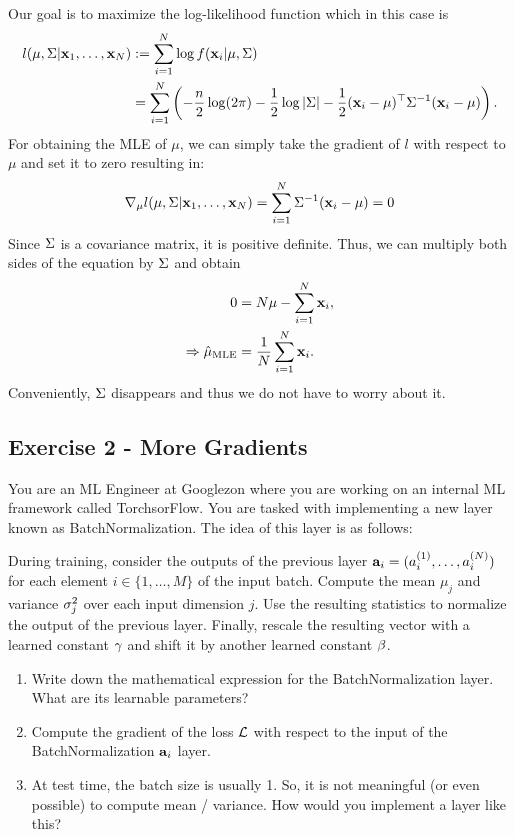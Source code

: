 \documentclass[
  letterpaper,
  DIV=11,
  numbers=noendperiod]{scrartcl}
\begin{document}
Our goal is to maximize the log-likelihood function which in this case
is \[\begin{aligned}
l(\mu, \Sigma| \mathbf{x}_1, \ldots, \mathbf{x}_N) 
  & := \sum_{i=1}^N \log f(\mathbf{x}_i | \mu, \Sigma) \\
  & = \sum_{i=1}^N \left( 
    - \frac{n}{2} \log (2 \pi) 
    - \frac{1}{2} \log |\Sigma|  
    - \frac{1}{2}  (\mathbf{x}_i - \mu)^\top \Sigma^{-1} (\mathbf{x}_i - \mu) 
  \right).
\end{aligned}\] For obtaining the MLE of \(\mu\), we can simply take the
gradient of \(l\) with respect to \(\mu\) and set it to zero resulting
in: \[
\nabla_\mu l(\mu, \Sigma| \mathbf{x}_1, \ldots, \mathbf{x}_N) 
 = \sum_{i=1}^N  \Sigma^{-1} ( \mathbf{x}_i - \mu )
 = 0 
\] Since \(\Sigma\) is a covariance matrix, it is positive definite. Thus,
we can multiply both sides of the equation by \(\Sigma\) and obtain \[
\begin{aligned}
0 & = N \mu - \sum_{i=1}^N  \mathbf{x}_i,
\\
\Rightarrow \hat{\mu}_{\mathrm{MLE}} &=  \frac{1}{N} \sum_{i=1}^N \mathbf{x}_i .
\end{aligned}
\] Conveniently, \(\Sigma\) disappears and thus we do not have to worry
about it.

\subsection{Exercise 2 - More
Gradients}\label{exercise-2---more-gradients}

You are an ML Engineer at Googlezon where you are working on an internal
ML framework called TorchsorFlow. You are tasked with implementing a new
layer known as BatchNormalization. The idea of this layer is as follows:

During training, consider the outputs of the previous layer
\(\mathbf{a}_i=(a_i^{(1)}, \ldots, a_i^{(N)})\) for each element
\(i\in \{1, \ldots, M\}\) of the input batch. Compute the mean \(\mu_j\)
and variance \(\sigma_j^2\) over each input dimension \(j\). Use the
resulting statistics to normalize the output of the previous layer.
Finally, rescale the resulting vector with a learned constant \(\gamma\)
and shift it by another learned constant \(\beta\).

\begin{enumerate}
\def\labelenumi{(\alph{enumi})}
\item
  Write down the mathematical expression for the BatchNormalization
  layer. What are its learnable parameters?
\item
  Compute the gradient of the loss \(\mathcal{L}\) with respect to the input of
  the BatchNormalization \(\mathbf{a}_i\) layer.
\item
  At test time, the batch size is usually 1. So, it is not meaningful
  (or even possible) to compute mean / variance. How would you implement
  a layer like this?
\end{enumerate}
\end{document}
